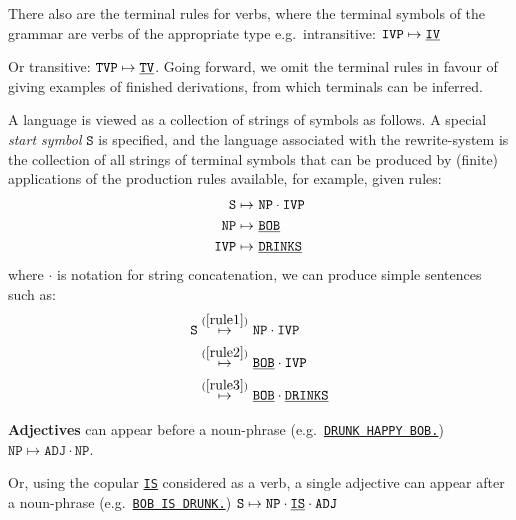 \begin{marginfigure}
\centering
{}
\caption{There also are the terminal rules for verbs, where the terminal symbols of the grammar are verbs of the appropriate type e.g.~intransitive: $\texttt{IVP} \mapsto \texttt{\underline{IV}}$}
\end{marginfigure}

\begin{marginfigure}
\centering
{}
\caption{Or transitive: $\texttt{TVP} \mapsto \texttt{\underline{TV}}$. Going forward, we omit the terminal rules in favour of giving examples of finished derivations, from which terminals can be inferred.}
\end{marginfigure}

 A language is viewed as a collection of strings of symbols as follows. A special \emph{start symbol} $\texttt{S}$ is specified, and the language associated with the rewrite-system is the collection of all strings of terminal symbols that can be produced by (finite) applications of the production rules available, for example, given rules:
\begin{align}
\texttt{S} \mapsto & \ \texttt{NP} \cdot \texttt{IVP}\label{rule1}\\   
\texttt{NP} \mapsto & \ \texttt{\underline{BOB}}\label{rule2}\\ 
\texttt{IVP} \mapsto & \ \texttt{\underline{DRINKS}}\label{rule3}
\end{align}
where $\cdot$ is notation for string concatenation, we can produce simple sentences such as:
\begin{align*}
\texttt{S} \overset{(\ref{rule1})}{\mapsto} & \ \texttt{NP} \cdot \texttt{IVP}\\
\overset{(\ref{rule2})}{\mapsto} & \ \texttt{\underline{BOB}} \cdot \texttt{IVP}\\
\overset{(\ref{rule3})}{\mapsto} & \ \texttt{\underline{BOB}} \cdot \texttt{\underline{DRINKS}}
\end{align*}

\begin{marginfigure}
\centering
{}
\caption{\textbf{Adjectives} can appear before a noun-phrase (e.g.~\texttt{\underline{DRUNK HAPPY BOB.}}) $\texttt{NP} \mapsto \texttt{ADJ} \cdot \texttt{NP}$.}
\end{marginfigure}

\begin{marginfigure}
\centering
{}
\caption{Or, using the copular \texttt{\underline{IS}} considered as a verb, a single adjective can appear after a noun-phrase (e.g.~\texttt{\underline{BOB IS DRUNK.}}) $\texttt{S} \mapsto \texttt{NP} \cdot \texttt{\underline{IS}} \cdot \texttt{ADJ}$}
\end{marginfigure}

